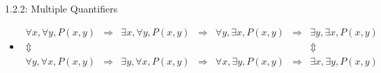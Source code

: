\documentclass[10pt,english]{beamer}
\begin{document}
\begin{frame}{1.2.2: Multiple Quantifiers}
\begin{itemize}
\vspace{-7mm}
 \item<3->[] {\small \color{blue} \[ \!\!\!\!\!\!\!\!\!\!\!\!\!\!\!\!\!\!\! \begin{array}{ccccccc}
   \forall x, \forall y, P(x,y) & \Rightarrow & \exists x, \forall y, P(x,y) & \Rightarrow & \forall y, \exists x, P(x,y) & \Rightarrow & \exists y, \exists x, P(x,y) \\
   \Updownarrow &&&&&& \Updownarrow \\
   \forall y, \forall x, P(x,y) & \Rightarrow & \exists y, \forall x, P(x,y) & \Rightarrow & \forall x, \exists y, P(x,y) & \Rightarrow & \exists x, \exists y, P(x,y)
   \end{array} \]}

\end{itemize}



%

\end{frame}
\end{document}
